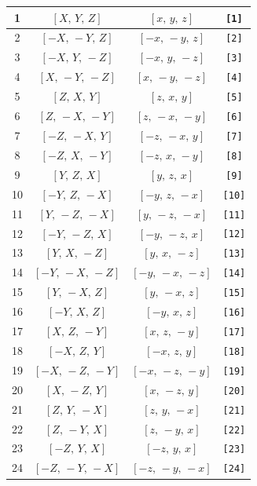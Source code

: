 \documentclass[fleqn,8pt]{jsarticle}
\begin{document}
\begin{longtable}{cccc}
1 & $\left[ X,\, Y,\, Z \right]$ & $\left[ x,\, y,\, z \right]$ & {\tt [1]} \\ \hline
2 & $\left[ - X,\, - Y,\, Z \right]$ & $\left[ - x,\, - y,\, z \right]$ & {\tt [2]} \\ \hline
3 & $\left[ - X,\, Y,\, - Z \right]$ & $\left[ - x,\, y,\, - z \right]$ & {\tt [3]} \\ \hline
4 & $\left[ X,\, - Y,\, - Z \right]$ & $\left[ x,\, - y,\, - z \right]$ & {\tt [4]} \\ \hline
5 & $\left[ Z,\, X,\, Y \right]$ & $\left[ z,\, x,\, y \right]$ & {\tt [5]} \\ \hline
6 & $\left[ Z,\, - X,\, - Y \right]$ & $\left[ z,\, - x,\, - y \right]$ & {\tt [6]} \\ \hline
7 & $\left[ - Z,\, - X,\, Y \right]$ & $\left[ - z,\, - x,\, y \right]$ & {\tt [7]} \\ \hline
8 & $\left[ - Z,\, X,\, - Y \right]$ & $\left[ - z,\, x,\, - y \right]$ & {\tt [8]} \\ \hline
9 & $\left[ Y,\, Z,\, X \right]$ & $\left[ y,\, z,\, x \right]$ & {\tt [9]} \\ \hline
10 & $\left[ - Y,\, Z,\, - X \right]$ & $\left[ - y,\, z,\, - x \right]$ & {\tt [10]} \\ \hline
11 & $\left[ Y,\, - Z,\, - X \right]$ & $\left[ y,\, - z,\, - x \right]$ & {\tt [11]} \\ \hline
12 & $\left[ - Y,\, - Z,\, X \right]$ & $\left[ - y,\, - z,\, x \right]$ & {\tt [12]} \\ \hline
13 & $\left[ Y,\, X,\, - Z \right]$ & $\left[ y,\, x,\, - z \right]$ & {\tt [13]} \\ \hline
14 & $\left[ - Y,\, - X,\, - Z \right]$ & $\left[ - y,\, - x,\, - z \right]$ & {\tt [14]} \\ \hline
15 & $\left[ Y,\, - X,\, Z \right]$ & $\left[ y,\, - x,\, z \right]$ & {\tt [15]} \\ \hline
16 & $\left[ - Y,\, X,\, Z \right]$ & $\left[ - y,\, x,\, z \right]$ & {\tt [16]} \\ \hline
17 & $\left[ X,\, Z,\, - Y \right]$ & $\left[ x,\, z,\, - y \right]$ & {\tt [17]} \\ \hline
18 & $\left[ - X,\, Z,\, Y \right]$ & $\left[ - x,\, z,\, y \right]$ & {\tt [18]} \\ \hline
19 & $\left[ - X,\, - Z,\, - Y \right]$ & $\left[ - x,\, - z,\, - y \right]$ & {\tt [19]} \\ \hline
20 & $\left[ X,\, - Z,\, Y \right]$ & $\left[ x,\, - z,\, y \right]$ & {\tt [20]} \\ \hline
21 & $\left[ Z,\, Y,\, - X \right]$ & $\left[ z,\, y,\, - x \right]$ & {\tt [21]} \\ \hline
22 & $\left[ Z,\, - Y,\, X \right]$ & $\left[ z,\, - y,\, x \right]$ & {\tt [22]} \\ \hline
23 & $\left[ - Z,\, Y,\, X \right]$ & $\left[ - z,\, y,\, x \right]$ & {\tt [23]} \\ \hline
24 & $\left[ - Z,\, - Y,\, - X \right]$ & $\left[ - z,\, - y,\, - x \right]$ & {\tt [24]} \\
\end{longtable}
\end{document}
